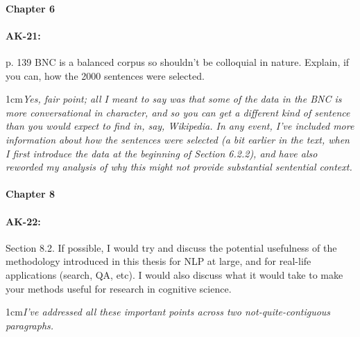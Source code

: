 \documentclass[11pt,a4paper]{article}
\newcommand{\res}[1]{\vspace{0.25cm} \begin{adjustwidth}{1cm}{}\emph{#1}\end{adjustwidth}}
\begin{document}
\paragraph{Chapter 6}

\paragraph{AK-21:} p. 139 BNC is a balanced corpus so shouldn’t be colloquial in nature. Explain, if you can, how the 2000 sentences were selected.

\res{Yes, fair point; all I meant to say was that some of the data in the BNC is more conversational in character, and so you can get a different kind of sentence than you would expect to find in, say, Wikipedia.  In any event, I've included more information about how the sentences were selected (a bit earlier in the text, when I first introduce the data at the beginning of Section 6.2.2), and have also reworded my analysis of why this might not provide substantial sentential context.}

\paragraph{Chapter 8}

\paragraph{AK-22:} Section 8.2. If possible, I would try and discuss the potential usefulness of the methodology introduced in this thesis for NLP at large, and for real-life applications (search, QA, etc). I would also discuss what it would take to make your methods useful for research in cognitive science.

\res{I've addressed all these important points across two not-quite-contiguous paragraphs.}
\end{document}
